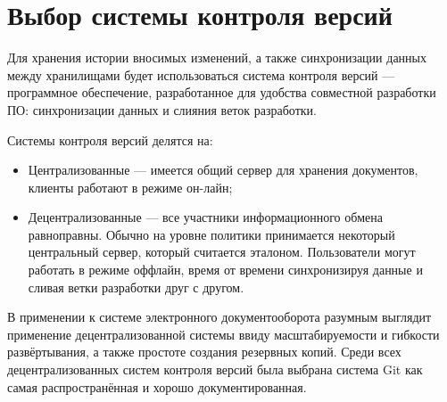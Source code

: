 \section{Выбор системы контроля версий} \label{technologic_cvs}

Для хранения истории вносимых изменений, а также синхронизации данных между хранилищами будет использоваться система контроля версий --- программное обеспечение, разработанное для удобства совместной разработки ПО: синхронизации данных и слияния веток разработки. 

\vspace{\baselineskip}
Системы контроля версий делятся на:
\begin{itemize}
		\item Централизованные --- имеется общий сервер для хранения документов, клиенты работают в режиме он-лайн;
		\item Децентрализованные --- все участники информационного обмена равноправны. Обычно на уровне политики принимается некоторый центральный сервер, который считается эталоном. Пользователи могут работать в режиме оффлайн, время от времени синхронизируя данные и сливая ветки разработки друг с другом.
	\end{itemize}

\vspace{\baselineskip}
В применении к системе электронного документооборота разумным выглядит применение децентрализованной системы ввиду масштабируемости и гибкости развёртывания, а также простоте создания резервных копий. Среди всех децентрализованных систем контроля версий была выбрана система Git как самая распространённая и хорошо документированная.